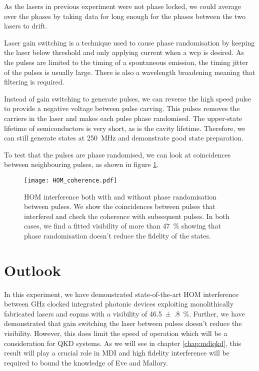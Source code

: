 As the lasers in previous experiment were not phase locked, we could average over the phases by taking data for long enough for the phases between the two lasers to drift.

Laser gain switching is a technique used to cause phase randomisation by keeping the laser below threshold and only applying current when a \ac{wcp} is desired. As the pulses are limited to the timing of a spontaneous emission, the timing jitter of the pulses is usually large. There is also a wavelength broadening meaning that filtering is required. 

Instead of gain switching to generate pulses, we can reverse the high speed pulse to provide a negative voltage between pulse carving. This pulses removes the carriers in the laser and makes each pulse phase randomised. The upper-state lifetime of semiconductors is very short, as is the cavity lifetime. Therefore, we can still generate states at \SI{250}{MHz} and demonstrate good state preparation.

To test that the pulses are phase randomised, we can look at coincidences between neighbouring pulses, as shown in figure \ref{fig:HOM_coherence}.  

\begin{figure}[tbp]
	\centering
	\texttt{[image: HOM\_coherence.pdf]}
	\caption[HOM interference with and without phase randomisation]{\ac{HOM} interference both with and without phase randomisation between pulses. We show the coincidences between pulses that interfered and check the coherence with subsequent pulses. In both cases, we find a fitted visibility of more than \SI{47}{\%} showing that phase randomisation doesn't reduce the fidelity of the states.}
	\label{fig:HOM_coherence}
\end{figure}

\section{Outlook}

In this experiment, we have demonstrated state-of-the-art \acl{HOM} interference between GHz clocked integrated photonic devices exploiting monolithically fabricated lasers and \acp{eopm} with a visibility of \SI{46.5(8)}{\%}. Further, we have demonstrated that gain switching the laser between pulses doesn't reduce the visibility. However, this does limit the speed of operation which will be a consideration for \ac{QKD} systems. As we will see in chapter \ref{chap:mdiqkd}, this result will play a crucial role in \ac{MDI} and high fidelity interference will be required to bound the knowledge of Eve and Mallory.

